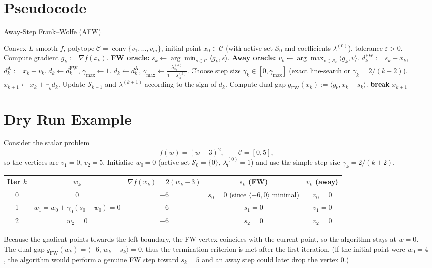 \documentclass{article}
\begin{document}
\section*{Pseudocode}
\begin{algorithm}[H]
\caption{Away‑Step Frank–Wolfe (AFW)}
\begin{algorithmic}[1]
\REQUIRE Convex $L$‑smooth $f$, polytope $\mathcal C=\operatorname{conv}\{v_1,\dots ,v_m\}$,
initial point $x_0\in\mathcal C$ (with active set $\mathcal S_0$ and coefficients $\lambda^{(0)}$), tolerance $\varepsilon>0$.
    \STATE Compute gradient $g_k:=\nabla f(x_k)$.
    \STATE \textbf{FW oracle: } $s_k\gets\arg\min_{s\in\mathcal C}\langle g_k,s\rangle$.
    \STATE \textbf{Away oracle: } $v_k\gets\arg\max_{v\in\mathcal S_k}\langle g_k,v\rangle$.
    \STATE $d_k^{\text{FW}}:=s_k-x_k$, $d_k^{\text{A}}:=x_k-v_k$.
        \STATE $d_k\gets d_k^{\text{FW}}$, $\gamma_{\max}\gets 1$.
    \ELSE
        \STATE $d_k\gets d_k^{\text{A}}$, $\displaystyle\gamma_{\max}\gets\frac{\lambda_{v_k}^{(k)}}{1-\lambda_{v_k}^{(k)}}$.
    \ENDIF
    \STATE Choose step size $\gamma_k\in[0,\gamma_{\max}]$ (exact line‑search or $\gamma_k=2/(k+2)$).
    \STATE $x_{k+1}\gets x_k+\gamma_k d_k$.
    \STATE Update $\mathcal S_{k+1}$ and $\lambda^{(k+1)}$ according to the sign of $d_k$.
    \STATE Compute dual gap $g_{\text{FW}}(x_k):=\langle g_k,x_k-s_k\rangle$.
        \STATE \textbf{break}
    \ENDIF
\ENDFOR
\RETURN $x_{k+1}$
\end{algorithmic}
\end{algorithm}

\section*{Dry Run Example}
Consider the scalar problem
\[
f(w)=(w-3)^2,\qquad \mathcal C=[0,5],
\]
so the vertices are $v_1=0$, $v_2=5$.  Initialise $w_0=0$ (active set $\mathcal S_0=\{0\}$, $\lambda^{(0)}_{0}=1$) and use the simple step‑size $\gamma_k=2/(k+2)$.

\begin{center}
\begin{tabular}{c|c|c|c|c}
Iter $k$ & $w_k$ & $\nabla f(w_k)=2(w_k-3)$ & $s_k$ (FW) & $v_k$ (away)\\ \hline
0 & $0$ & $-6$ & $s_0=0$ (since $\langle-6,0\rangle$ minimal) & $v_0=0$\\
1 & $w_1= w_0+\gamma_0(s_0-w_0)=0$ & $-6$ & $s_1=0$ & $v_1=0$\\
2 & $w_2=0$ & $-6$ & $s_2=0$ & $v_2=0$\\
\end{tabular}
\end{center}
Because the gradient points towards the left boundary, the FW vertex coincides with the current point, so the algorithm stays at $w=0$.  The dual gap $g_{\text{FW}}(w_k)=\langle -6,\,w_k-s_k\rangle=0$, thus the termination criterion is met after the first iteration.  (If the initial point were $w_0=4$, the algorithm would perform a genuine FW step toward $s_k=5$ and an away step could later drop the vertex $0$.)
\end{document}

